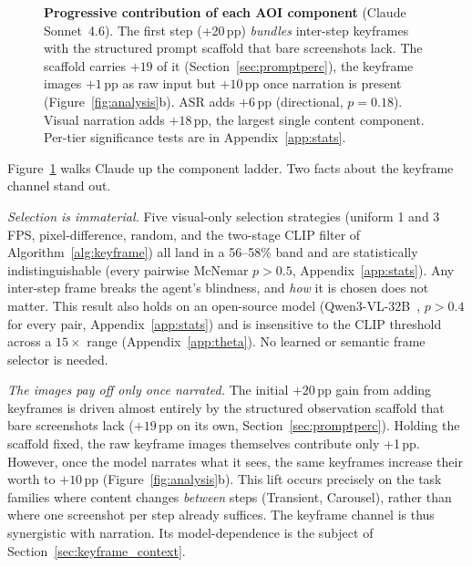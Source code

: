 \documentclass[11pt]{article}
\begin{document}
\begin{figure}[t]
\caption{\textbf{Progressive contribution of each AOI component} (Claude Sonnet~4.6).
The first step (+20\,pp) \emph{bundles} inter-step keyframes with the structured
prompt scaffold that bare screenshots lack. The scaffold carries $+19$ of it
(Section~\ref{sec:promptperc}), the keyframe images $+1$\,pp as raw input but
$+10$\,pp once narration is present (Figure~\ref{fig:analysis}b).
ASR adds $+6$\,pp (directional, $p=0.18$). Visual narration adds $+18$\,pp, the
largest single content component. Per-tier significance tests are in
Appendix~\ref{app:stats}.}
\label{fig:ablation}
\end{figure}

Figure~\ref{fig:ablation} walks Claude up the component ladder. Two facts about
the keyframe channel stand out.

\emph{Selection is immaterial.}
Five visual-only selection strategies (uniform 1 and 3\,FPS, pixel-difference,
random, and the two-stage CLIP filter of Algorithm~\ref{alg:keyframe}) all land
in a 56--58\% band and are statistically indistinguishable (every pairwise McNemar
$p>0.5$, Appendix~\ref{app:stats}).
Any inter-step frame breaks the agent's blindness, and \emph{how} it is chosen does
not matter. This result also holds on an open-source model (Qwen3-VL-32B~\citep{qwen3vl},
$p>0.4$ for every pair, Appendix~\ref{app:stats}) and is insensitive to the CLIP
threshold across a $15\times$ range (Appendix~\ref{app:theta}).
No learned or semantic frame selector is needed.

\emph{The images pay off only once narrated.}
The initial $+20$\,pp gain from adding keyframes is driven almost entirely by the structured observation scaffold that bare screenshots lack ($+19$\,pp on its own, Section~\ref{sec:promptperc}). Holding the scaffold fixed, the raw keyframe images themselves contribute only +1\,pp.
However, once the model narrates what it sees, the same keyframes increase their worth to $+10$\,pp
(Figure~\ref{fig:analysis}b). This lift occurs precisely on the task families where
content changes \emph{between} steps (Transient, Carousel), rather than where one
screenshot per step already suffices.
The keyframe channel is thus synergistic with narration. Its model-dependence is
the subject of Section~\ref{sec:keyframe_context}.
\end{document}
